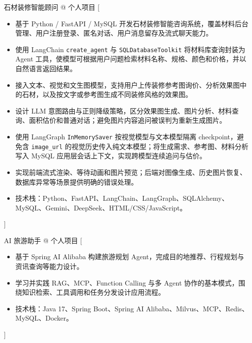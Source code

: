 \documentclass[zh]{resume}
\begin{document}
\begin{experiences}

    {石材装修智能顾问 @ 个人项目}%
    [\begin{itemize}
      \item 基于 Python / FastAPI / MySQL 开发石材装修智能咨询系统，覆盖材料后台管理、用户注册登录、匿名对话、用户消息留存及流式聊天能力。
      \item 使用 LangChain \texttt{create\_agent} 与 \texttt{SQLDatabaseToolkit} 将材料库查询封装为 Agent 工具，使模型可根据用户问题检索材料名称、规格、颜色和价格，并以自然语言返回结果。
      \item 接入文本、视觉和文生图模型，支持用户上传装修参考图询价、分析效果图中的石材，以及按文字或参考图生成不同装修风格的效果图。
      \item 设计 LLM 意图路由与正则降级策略，区分效果图生成、图片分析、材料查询、面积估价和普通对话；避免图片内容追问被误判为重新生成图片。
      \item 使用 LangGraph \texttt{InMemorySaver} 按视觉模型与文本模型隔离 checkpoint，避免含 \texttt{image\_url} 的视觉历史传入纯文本模型；将生成需求、参考图、材料分析写入 MySQL 应用层会话上下文，实现跨模型连续追问与估价。
      \item 实现前端流式渲染、等待动画和图片预览；后端对图像生成、历史图片恢复、数据库异常等场景提供明确的错误处理。
      \item 技术栈：Python、FastAPI、LangChain、LangGraph、SQLAlchemy、MySQL、Gemini、DeepSeek、HTML/CSS/JavaScript。
    \end{itemize}]

  \separator{0.5ex}

    {AI 旅游助手 @ 个人项目}%
    [\begin{itemize}
      \item 基于 Spring AI Alibaba 构建旅游规划 Agent，完成目的地推荐、行程规划与资讯查询等能力设计。
      \item 学习并实践 RAG、MCP、Function Calling 与多 Agent 协作的基本模式，围绕知识检索、工具调用和任务分发设计应用流程。
      \item 技术栈：Java 17、Spring Boot、Spring AI Alibaba、Milvus、MCP、Redis、MySQL、Docker。
    \end{itemize}]

\end{experiences}
\end{document}
